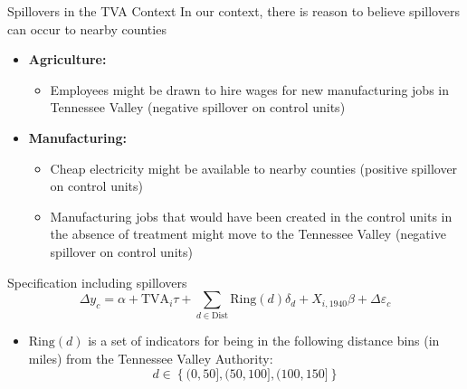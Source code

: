 \documentclass[aspectratio=169]{beamer}
\begin{document}
\begin{frame}{Spillovers in the TVA Context}
    In our context, there is reason to believe spillovers can occur to nearby counties

    \begin{itemize}
        \item \textbf{Agriculture:} 
        \begin{itemize}
            \item Employees might be drawn to hire wages for new manufacturing jobs in Tennessee Valley (negative spillover on control units)
        \end{itemize}
        
        \item \textbf{Manufacturing:}
        \begin{itemize}
            \item Cheap electricity might be available to nearby counties (positive spillover on control units) 
            
            \item Manufacturing jobs that would have been created in the control units in the absence of treatment might move to the Tennessee Valley (negative spillover on control units)
        \end{itemize}
    \end{itemize}
\end{frame}

\begin{frame}{Specification including spillovers}
    \begin{equation}
        \Delta y_c = \alpha + \text{TVA}_i \tau + \sum_{d \in \text{Dist}} \text{Ring}(d)\delta_d + X_{i, 1940} \beta + \Delta \varepsilon_c
    \end{equation} 

    \begin{itemize}
        \item $\text{Ring}(d)$ is a set of indicators for being in the following distance bins (in miles) from the Tennessee Valley Authority: 
        \[ d \in \left\{ (0, 50], (50, 100], (100, 150] \right\} \]
    \end{itemize}
\end{frame}

\end{document}
